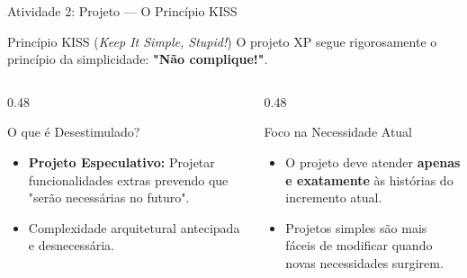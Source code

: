 \documentclass[aspectratio=169, 9pt]{beamer}
\begin{document}
\begin{frame}{Atividade 2: Projeto --- O Princípio KISS}
  \begin{block}{Princípio KISS (\textit{Keep It Simple, Stupid!})}
    O projeto XP segue rigorosamente o princípio da simplicidade: \textbf{"Não complique!"}.
  \end{block}

  \vspace{0.3cm}

  \begin{columns}[T]
    \begin{column}{0.48\textwidth}
      \begin{alertblock}{O que é Desestimulado?}
        \begin{itemize}
          \item \textbf{Projeto Especulativo:} Projetar funcionalidades extras prevendo que "serão necessárias no futuro".
          \item Complexidade arquitetural antecipada e desnecessária.
        \end{itemize}
      \end{alertblock}
    \end{column}

    \begin{column}{0.48\textwidth}
      \begin{exampleblock}{Foco na Necessidade Atual}
        \begin{itemize}
          \item O projeto deve atender \textbf{apenas e exatamente} às histórias do incremento atual.
          \item Projetos simples são mais fáceis de modificar quando novas necessidades surgirem.
        \end{itemize}
      \end{exampleblock}
    \end{column}
  \end{columns}
\end{frame}
\end{document}
